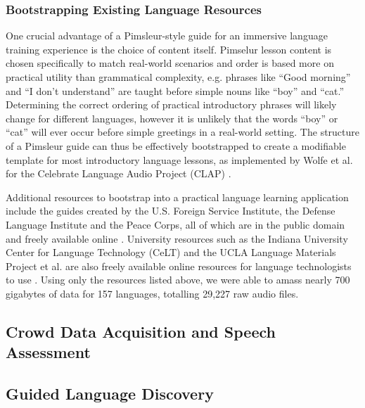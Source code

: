 \subsubsection{Bootstrapping Existing Language Resources}

One crucial advantage of a Pimsleur-style guide for an immersive language training experience is the choice of content itself. Pimselur lesson content is chosen specifically to match real-world scenarios and order is based more on practical utility than grammatical complexity, e.g. phrases like ``Good morning'' and ``I don't understand'' are taught before simple nouns like ``boy'' and ``cat.'' Determining the correct ordering of practical introductory phrases will likely change for different languages, however it is unlikely that the words ``boy'' or ``cat'' will ever occur before simple greetings in a real-world setting. The structure of a Pimsleur guide can thus be effectively bootstrapped to create a modifiable template for most introductory language lessons, as implemented by Wolfe et al. for the Celebrate Language Audio Project (CLAP) \cite{wolfeclap}. 

Additional resources to bootstrap into a practical language learning application include the guides created by the U.S. Foreign Service Institute, the Defense Language Institute and the Peace Corps, all of which are in the public domain and freely available online \cite{peacecorps} \cite{fsi} \cite{livelingua}. University resources such as the Indiana University Center for Language Technology (CeLT) and the UCLA Language Materials Project et al. are also freely available online resources for language technologists to use \cite{ucla} \cite{celt}. Using only the resources listed above, we were able to amass nearly 700 gigabytes of data for 157 languages, totalling 29,227 raw audio files.

 







\subsection{Crowd Data Acquisition and Speech Assessment}
\subsection{Guided Language Discovery}